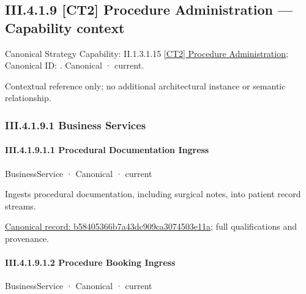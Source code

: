 \subsection*{III.4.1.9 [CT2] Procedure Administration — Capability context}
\label{navigation:III.4.1.9}

{\small Canonical Strategy Capability: II.1.3.1.15 \hyperref[element:649dd7cc26094e539386a050086dfb91]{[CT2] Procedure Administration}; Canonical ID: \texttt{}. Canonical · current.}\par
Contextual reference only; no additional architectural instance or semantic relationship.\par
\subsubsection*{III.4.1.9.1 Business Services}
\label{navigation:III.4.1.9.1}

\paragraph*{III.4.1.9.1.1 Procedural Documentation Ingress}
\label{navigation:III.4.1.9.1.1}

\label{element:b58405366b7a43dc909ca3074503e11a}
{\small BusinessService · Canonical · current}\par

Ingests procedural documentation, including surgical notes, into patient record streams.


{\footnotesize \href{../../../../../../../continuum/business/business-service/b58405366b7a43dc909ca3074503e11a.md}{Canonical record: b58405366b7a43dc909ca3074503e11a}; full qualifications and provenance.}\par
\paragraph*{III.4.1.9.1.2 Procedure Booking Ingress}
\label{navigation:III.4.1.9.1.2}

\label{element:64c52e8e6f304dee8d86a5da96f927e3}
{\small BusinessService · Canonical · current}\par

